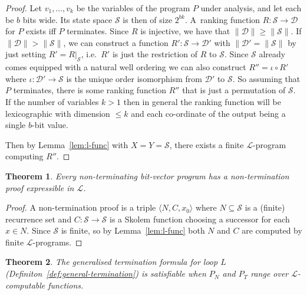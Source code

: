 \documentclass[preprint]{sigplanconf}
\newtheorem{theorem}{Theorem}
\theoremstyle{definition}
\begin{document}
\begin{proof}
%
Let $v_1, \ldots, v_k$ be the variables of the program $P$ under analysis,
and let each be $b$ bits wide.  Its state space $\mathcal{S}$ is then of
size $2^{bk}$.  A~ranking function $R: \mathcal{S} \to \mathcal{D}$ for $P$
exists iff $P$ terminates.  Since $R$ is injective, we have that $\|
\mathcal{D} \| \geq \| \mathcal{S} \|$.  If $\| \mathcal{D} \| > \|
\mathcal{S} \|$, we can construct a function $R': \mathcal{S} \to
\mathcal{D'}$ with $ \| \mathcal{D'} = \| \mathcal{S} \|$ by just setting
$R' = R|_\mathcal{S}$, i.e.~$R'$ is just the restriction of $R$ to
$\mathcal{S}$.  Since $\mathcal{S}$ already comes equipped with a natural
well ordering we can also construct $R'' = \iota \circ R'$ where $\iota:
\mathcal{D'} \to \mathcal{S}$ is the unique order isomorphism from
$\mathcal{D'}$ to $\mathcal{S}$.  So assuming that $P$ terminates, there is
some ranking function $R''$ that is just a permutation of $\mathcal{S}$.  If
the number of variables $k > 1$ then in general the ranking function will be
lexicographic with dimension $\leq k$ and each co-ordinate of the output
being a single $b$-bit value.

Then by Lemma~\ref{lem:l-func} with $X = Y = \mathcal{S}$, there exists
a finite $\mathcal{L}$-program computing $R''$.

%
\end{proof}

\begin{theorem}
\label{thm:l-nonterm}
 Every non-terminating bit-vector program has a non-termination proof expressible in $\mathcal{L}$.
\end{theorem}

\begin{proof}
 A non-termination proof is a triple $\langle N, C, x_0 \rangle$ where $N \subseteq \mathcal{S}$ is
 a (finite) recurrence set and $C : \mathcal{S} \to \mathcal{S}$ is a Skolem function choosing
 a successor for each $x \in N$.  Since $\mathcal{S}$ is finite, so by Lemma~\ref{lem:l-func} both
 $N$ and $C$ are computed by finite $\mathcal{L}$-programs.
\end{proof}

\begin{theorem}
 \label{thm:generalised-sat}
 The generalised termination formula for loop $L$ (Definiton~\ref{def:general-termination}) is satisfiable
 when $P_N$ and $P_T$ range over \mbox{$\mathcal{L}$-computable} functions.
\end{theorem}
\end{document}
